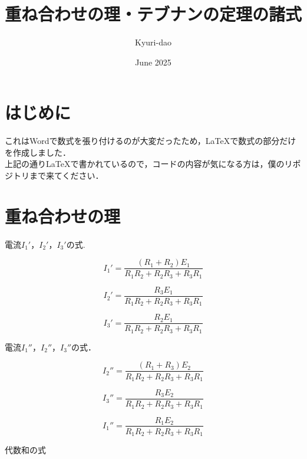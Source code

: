 \documentclass{article}
\title{重ね合わせの理・テブナンの定理の諸式}
\author{Kyuri-dao}
\date{June 2025}
\begin{document}
\maketitle

\section{はじめに}
これはWordで数式を張り付けるのが大変だったため，LaTeXで数式の部分だけを作成しました．\\
上記の通りLaTeXで書かれているので，コードの内容が気になる方は，僕のリポジトリまで来てください．

\section{重ね合わせの理}

\begin{center}
    電流$I_1'$，$I_2'$，$I_3'$の式.
\end{center}



\begin{equation}
    I_1' = \frac{(R_1 + R_2)E_1}{R_1R_2+R_2R_3+R_3R_1}
\end{equation}

\begin{equation}
    I_2' = \frac{R_3E_1}{R_1R_2+R_2R_3+R_3R_1}
\end{equation}

\begin{equation}
    I_3' = \frac{R_2E_1}{R_1R_2+R_2R_3+R_3R_1}
\end{equation}

\begin{center}
    電流$I_1''$，$I_2''$，$I_3''$の式．    
\end{center}


\begin{equation}
    I_2'' = \frac{(R_1+R_3)E_2}{R_1R_2+R_2R_3+R_3R_1}    
\end{equation}

\begin{equation}
    I_3'' = \frac{R_3E_2}{R_1R_2+R_2R_3+R_3R_1}
\end{equation}

\begin{equation}
    I_1'' = \frac{R_1E_2}{R_1R_2+R_2R_3+R_3R_1}
\end{equation}

\begin{center}
    代数和の式
\end{center}
\end{document}
